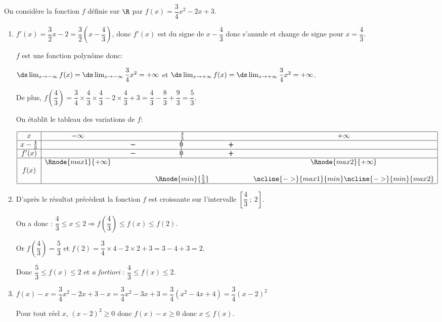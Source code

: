 \medskip

On considère la fonction $f$ définie sur $\R$ par 
$f(x) = \dfrac34 x^2 - 2x + 3.$

\begin{enumerate}
\item 
$f'(x)=\dfrac{3}{2}x -2 = \dfrac{3}{2}\left (x-\dfrac{4}{3}\right )$, donc $f'(x)$ est du signe de $x-\dfrac{4}{3}$ donc s'annule et change de signe pour $x=\dfrac{4}{3}$.

$f$ est une fonction polynôme donc:

$\ds\lim_{x\to -\infty} f(x) = \ds\lim_{x\to -\infty} \dfrac{3}{4}x^2 = +\infty$
et
$\ds\lim_{x\to +\infty} f(x) = \ds\lim_{x\to +\infty} \dfrac{3}{4}x^2 = +\infty$.

De plus, $f\left(\dfrac43\right) = \dfrac34 \times \dfrac43 \times \dfrac43 - 2\times \dfrac43 + 3 = \dfrac43 - \dfrac83 + \dfrac93 = \dfrac53$.

On établit le tableau des variations de $f$:

\begin{center}
{\renewcommand{\arraystretch}{1.3}
\def\esp{\hspace*{1.5cm}}
\def\hauteur{0pt}
$\begin{array}{|c| *4{c} c|}
\hline
 x & -\infty & \esp & \frac{4}{3} & \esp & +\infty \\
\hline
x-\frac{4}{3} &  &  \pmb{-} & \vline\hspace{-2.7pt}0 & \pmb{+} & \\
 \hline
f'(x) &  &  \pmb{-} & \vline\hspace{-2.7pt}0 & \pmb{+} & \\  
\hline
  & \Rnode{max1}{+\infty}  &  &  &  & \Rnode{max2}{+\infty}   \\
f(x) & &  & & &  \rule{0pt}{\hauteur} \\
 &  & &   \Rnode{min}{\frac{5}{3}} & & \rule{0pt}{\hauteur}
\ncline{->}{max1}{min} \ncline{->}{min}{max2}\\
\hline
\end{array}$
}
\end{center}

\item 
D'après le résultat précédent la fonction $f$ est croissante sur l'intervalle $\left[\dfrac43~;~2\right]$.

On a donc : $\dfrac43 \leqslant x \leqslant 2 \Longrightarrow f\left(\dfrac43\right) \leqslant f(x) \leqslant f(2)$.

Or $f\left(\dfrac43\right) = \dfrac53$ et $f(2) = \dfrac34 \times 4 - 2 \times 2 + 3 = 3 - 4 + 3 = 2$.

Donc $\dfrac53 \leqslant f(x) \leqslant  2$ et \emph{a fortiori} : $\dfrac43 \leqslant f(x) \leqslant 2$.

\item




$f(x)-x = \dfrac{3}{4} x^2 -2x+3-x = \dfrac{3}{4}x^2 - 3x +3 = \dfrac{3}{4}\left ( x^2 -4x+4 \right ) = \dfrac{3}{4} \left (x-2\right )^2$ 

Pour tout réel $x$, $(x-2)^2\geqslant 0$ donc $f(x)-x \geqslant 0$ donc $x\leqslant f(x)$.
\end{enumerate}

